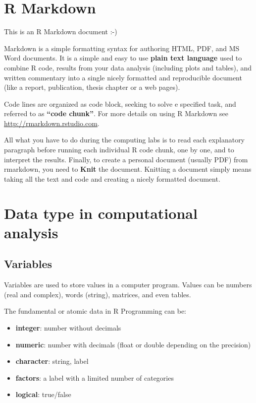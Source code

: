 \documentclass[
]{book}
\providecommand{\tightlist}{%
  \setlength{\itemsep}{0pt}\setlength{\parskip}{0pt}}
\theoremstyle{definition}
\theoremstyle{definition}
\theoremstyle{definition}
\theoremstyle{definition}
\theoremstyle{remark}
\begin{document}
\hypertarget{r-markdown}{%
\section{R Markdown}\label{r-markdown}}

This is an R Markdown document :-)

Markdown is a simple formatting syntax for authoring HTML, PDF, and MS Word documents.
It is a simple and easy to use \textbf{plain text language} used to combine R code, results from your data analysis (including plots and tables), and written commentary into a single nicely formatted and reproducible document (like a report, publication, thesis chapter or a web pages).

Code lines are organized as code block, seeking to solve e specified task, and referred to as \textbf{``code chunk''}.
For more details on using R Markdown see \url{http://rmarkdown.rstudio.com}.

All what you have to do during the computing labs is to read each explanatory paragraph before running each individual R code chunk, one by one, and to interpret the results.
Finally, to create a personal document (usually PDF) from rmarkdown, you need to \textbf{Knit} the document.
Knitting a document simply means taking all the text and code and creating a nicely formatted document.

\hypertarget{data-type-in-computational-analysis}{%
\section{Data type in computational analysis}\label{data-type-in-computational-analysis}}

\hypertarget{variables}{%
\subsection{Variables}\label{variables}}

Variables are used to store values in a computer program.
Values can be numbers (real and complex), words (string), matrices, and even tables.

The fundamental or atomic data in R Programming can be:

\begin{itemize}
\tightlist
\item
  \textbf{integer}: number without decimals
\item
  \textbf{numeric}: number with decimals (float or double depending on the precision)
\item
  \textbf{character}: string, label
\item
  \textbf{factors}: a label with a limited number of categories
\item
  \textbf{logical}: true/false
\end{itemize}
\end{document}

